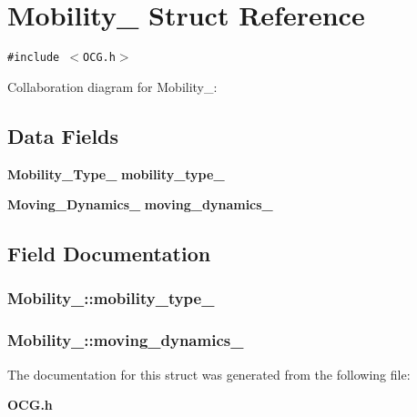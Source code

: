 \section{Mobility\_\- Struct Reference}
\label{structMobility__}
{\tt \#include $<$OCG.h$>$}

Collaboration diagram for Mobility\_\-:\subsection*{Data Fields}
\begin{CompactItemize}
\item 
{\bf Mobility\_\-Type\_\-} {\bf mobility\_\-type\_\-}
\item 
{\bf Moving\_\-Dynamics\_\-} {\bf moving\_\-dynamics\_\-}
\end{CompactItemize}


\subsection{Field Documentation}
\subsubsection[{mobility\_\-type\_\-}]{ {\bf Mobility\_\-::mobility\_\-type\_\-}}\label{structMobility___2c4f24e92f484f94edb3a37a773c1b09}


\subsubsection[{moving\_\-dynamics\_\-}]{ {\bf Mobility\_\-::moving\_\-dynamics\_\-}}\label{structMobility___b51e1178fdbee3e166947f89e186aa40}




The documentation for this struct was generated from the following file:\begin{CompactItemize}
\item 
{\bf OCG.h}\end{CompactItemize}

